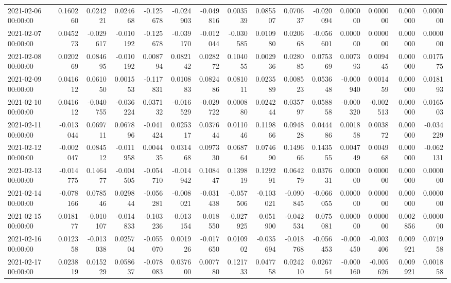 \begin{tabular}{lrrrrrrrrrrrrrr}
2021-02-06 00:00:00 & 0.160260 & 0.024221 & 0.024668 & -0.125678 & -0.024903 & -0.049816 & 0.003539 & 0.085507 & 0.070637 & -0.020094 & 0.000000 & 0.000000 & 0.000000 & 0.000000 \\
2021-02-07 00:00:00 & 0.045273 & -0.029617 & -0.010192 & -0.125678 & -0.039170 & -0.012044 & -0.030585 & 0.010980 & 0.020668 & -0.056601 & 0.000000 & 0.000000 & 0.000000 & 0.000000 \\
2021-02-08 00:00:00 & 0.020269 & 0.084695 & -0.010192 & 0.008794 & 0.082142 & 0.028272 & 0.104055 & 0.002936 & 0.028085 & 0.075369 & 0.007393 & 0.009445 & 0.000000 & 0.017575 \\
2021-02-09 00:00:00 & 0.041612 & 0.061050 & 0.001553 & -0.117831 & 0.010883 & 0.082486 & 0.081011 & 0.023589 & 0.008523 & 0.053648 & -0.000940 & 0.001459 & 0.000000 & 0.018193 \\
2021-02-10 00:00:00 & 0.041612 & -0.040755 & -0.036224 & 0.037132 & -0.016529 & -0.029722 & 0.000880 & 0.024244 & 0.035797 & 0.058858 & -0.000320 & -0.002513 & 0.000000 & 0.016503 \\
2021-02-11 00:00:00 & -0.013044 & 0.069711 & 0.067896 & -0.041424 & 0.025317 & 0.037644 & 0.011046 & 0.119866 & 0.094828 & 0.044486 & 0.001858 & 0.003872 & 0.000000 & -0.034229 \\
2021-02-12 00:00:00 & -0.002047 & 0.084512 & -0.011958 & 0.004435 & 0.031468 & 0.097330 & 0.068764 & 0.074690 & 0.149666 & 0.143555 & 0.004749 & 0.004968 & 0.000000 & -0.062131 \\
2021-02-13 00:00:00 & -0.014775 & 0.146477 & -0.004505 & -0.054710 & -0.014942 & 0.108447 & 0.139819 & 0.129291 & 0.064279 & 0.037631 & 0.000000 & 0.000000 & 0.000000 & 0.000000 \\
2021-02-14 00:00:00 & -0.078166 & 0.078546 & 0.029844 & -0.056281 & -0.008021 & -0.031438 & -0.057506 & -0.103021 & -0.090845 & -0.066055 & 0.000000 & 0.000000 & 0.000000 & 0.000000 \\
2021-02-15 00:00:00 & 0.018177 & -0.010107 & -0.014833 & -0.103236 & -0.013154 & -0.018550 & -0.027925 & -0.051900 & -0.042534 & -0.075081 & 0.000000 & 0.000000 & 0.002856 & 0.000000 \\
2021-02-16 00:00:00 & 0.012358 & -0.013038 & 0.025704 & -0.055070 & 0.001926 & -0.017650 & 0.010902 & -0.035694 & -0.018768 & -0.056453 & -0.000450 & -0.003406 & 0.009921 & 0.071958 \\
2021-02-17 00:00:00 & 0.023819 & 0.015229 & 0.058637 & -0.078083 & 0.037600 & 0.007780 & 0.121733 & 0.047758 & 0.024210 & 0.026754 & -0.000160 & -0.005626 & 0.009921 & 0.001858 \\

\end{tabular}
